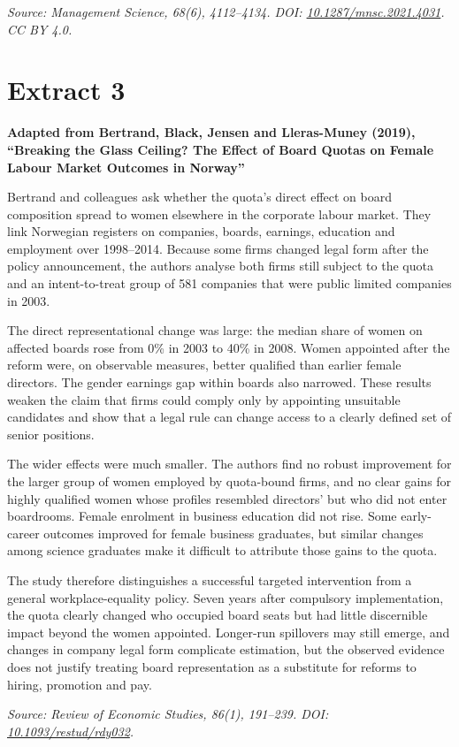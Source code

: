 \documentclass[11pt,a4paper]{article}
\newcommand{\sourceheading}[2]{%
  \section*{#1}
  \textbf{#2}\par\medskip
}
\begin{document}
\textit{Source: Management Science, 68(6), 4112--4134. DOI: \href{https://doi.org/10.1287/mnsc.2021.4031}{10.1287/mnsc.2021.4031}. CC BY 4.0.}

\newpage

\sourceheading{Extract 3}{Adapted from Bertrand, Black, Jensen and Lleras-Muney (2019), ``Breaking the Glass Ceiling? The Effect of Board Quotas on Female Labour Market Outcomes in Norway''}

Bertrand and colleagues ask whether the quota's direct effect on board composition spread to women elsewhere in the corporate labour market. They link Norwegian registers on companies, boards, earnings, education and employment over 1998--2014. Because some firms changed legal form after the policy announcement, the authors analyse both firms still subject to the quota and an intent-to-treat group of 581 companies that were public limited companies in 2003.

The direct representational change was large: the median share of women on affected boards rose from 0\% in 2003 to 40\% in 2008. Women appointed after the reform were, on observable measures, better qualified than earlier female directors. The gender earnings gap within boards also narrowed. These results weaken the claim that firms could comply only by appointing unsuitable candidates and show that a legal rule can change access to a clearly defined set of senior positions.

The wider effects were much smaller. The authors find no robust improvement for the larger group of women employed by quota-bound firms, and no clear gains for highly qualified women whose profiles resembled directors' but who did not enter boardrooms. Female enrolment in business education did not rise. Some early-career outcomes improved for female business graduates, but similar changes among science graduates make it difficult to attribute those gains to the quota.

The study therefore distinguishes a successful targeted intervention from a general workplace-equality policy. Seven years after compulsory implementation, the quota clearly changed who occupied board seats but had little discernible impact beyond the women appointed. Longer-run spillovers may still emerge, and changes in company legal form complicate estimation, but the observed evidence does not justify treating board representation as a substitute for reforms to hiring, promotion and pay.

\textit{Source: Review of Economic Studies, 86(1), 191--239. DOI: \href{https://doi.org/10.1093/restud/rdy032}{10.1093/restud/rdy032}.}
\end{document}
